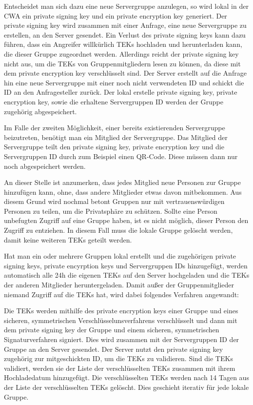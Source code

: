 \documentclass[conference]{IEEEtran}
\begin{document}
Entscheidet man sich dazu eine neue Servergruppe anzulegen, so wird lokal in der CWA ein private signing key und ein private encryption key generiert.
Der private signing key wird zusammen mit einer Anfrage, eine neue Servergruppe zu erstellen, an den Server gesendet.
Ein Verlust des private signing keys kann dazu führen, dass ein Angreifer willkürlich TEKs hochladen und herunterladen kann, die dieser Gruppe zugeordnet werden.
Allerdings reicht der private signing key nicht aus, um die TEKs von Gruppenmitgliedern lesen zu können, da diese mit dem private encryption key verschlüsselt sind.
Der Server erstellt auf die Anfrage hin eine neue Servergruppe mit einer noch nicht verwendeten ID und schickt die ID an den Anfragesteller zurück.
Der lokal erstelle private signing key, private encryption key, sowie die erhaltene Servergruppen ID werden der Gruppe zugehörig abgespeichert.

Im Falle der zweiten Möglichkeit, einer bereits existierenden Servergruppe beizutreten, benötigt man ein Mitglied der Servergruppe.
Das Mitglied der Servergruppe teilt den private signing key, private encryption key und die Servergruppen ID durch zum Beispiel einen QR-Code.
Diese müssen dann nur noch abgespeichert werden.

An dieser Stelle ist anzumerken, dass jedes Mitglied neue Personen zur Gruppe hinzufügen kann, ohne, dass andere Mitglieder etwas davon mitbekommen.
Aus diesem Grund wird nochmal betont Gruppen nur mit vertrauenswürdigen Personen zu teilen, um die Privatsphäre zu schützen.
Sollte eine Person unbefugten Zugriff auf eine Gruppe haben, ist es nicht möglich, dieser Person den Zugriff zu entziehen.
In diesem Fall muss die lokale Gruppe gelöscht werden, damit keine weiteren TEKs geteilt werden.

Hat man ein oder mehrere Gruppen lokal erstellt und die zugehörigen private signing keys, private encyrption keys und Servergruppen IDs hinzugefügt, werden automatisch alle 24h die eigenen TEKs auf den Server hochgeladen und die TEKs der anderen Mitglieder heruntergeladen.
Damit außer der Gruppenmitglieder niemand Zugriff auf die TEKs hat, wird dabei folgendes Verfahren angewandt:

Die TEKs werden mithilfe des private encryption keys einer Gruppe und eines sicheren, symmetrischen Verschlüsselunsverfahrens verschlüsselt und dann mit dem private signing key der Gruppe und einem sicheren, symmetrischen Signaturverfahren signiert.
Dies wird zusammen mit der Servergruppen ID der Gruppe an den Server gesendet.
Der Server nutzt den private signing key zugehörig zur mitgeschickten ID, um die TEKs zu validieren.
Sind die TEKs validiert, werden sie der Liste der verschlüsselten TEKs zusammen mit ihrem Hochladedatum hinzugefügt.
Die verschlüsselten TEKs werden nach 14 Tagen aus der Liste der verschlüsselten TEKs gelöscht.
Dies geschieht iterativ für jede lokale Gruppe.
\end{document}
